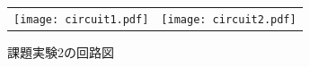 \documentclass[11pt,dvipdfmx]{jarticle}
\begin{document}
		\begin{figure}[H]
			\begin{tabular}{cc}
				\begin{minipage}[c]{0.5\linewidth}
				\centering
				\texttt{[image: circuit1.pdf]}
				\caption{課題実験1の回路図}
				\label{fig:circuit1}
				
			\end{minipage}&

			\begin{minipage}[c]{0.5\linewidth}
				\centering
				\texttt{[image: circuit2.pdf]}
				\caption{課題実験2の回路図}
				\label{fig:circuit2}
				
			\end{minipage}

			\end{tabular}

		\end{figure}
\end{document}
